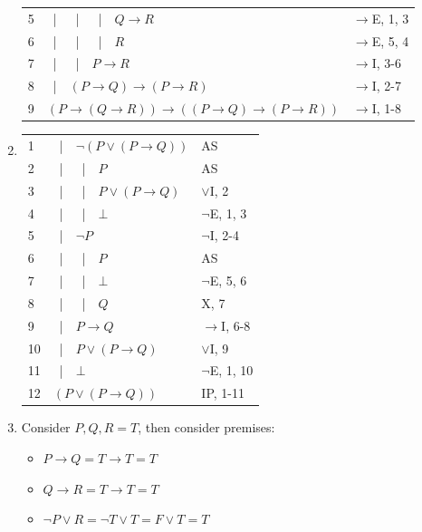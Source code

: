 \documentclass{article}
\newcommand{\asbar}{\ |\ \ }
\begin{document}
\begin{enumerate}
\begin{tabular}{l|p{8cm}l}
              5 & \asbar \asbar \asbar $Q \to R$                    & $\to$E, 1, 3 \\
              6 & \asbar \asbar \asbar $R$                          & $\to$E, 5, 4 \\
              7 & \asbar \asbar $P \to R$                           & $\to$I, 3-6  \\
              8 & \asbar $(P \to Q) \to (P \to R)$                  & $\to$I, 2-7  \\
              9 & $(P \to (Q \to R)) \to ((P \to Q) \to (P \to R))$ & $\to$I, 1-8  \\
              \hline
          \end{tabular}
    \item \begin{tabular}{l|p{8cm}l}
              \hline
              1  & \asbar $\neg (P \lor (P \to Q))$ & AS             \\
              2  & \asbar \asbar $P$                & AS             \\
              3  & \asbar \asbar $P \lor (P \to Q)$ & $\lor$I, 2     \\
              4  & \asbar \asbar $\bot$             & $\neg$E, 1, 3  \\
              5  & \asbar $ \neg P$                 & $\neg$I, 2-4   \\
              6  & \asbar \asbar $P$                & AS             \\
              7  & \asbar \asbar $\bot$             & $\neg$E, 5, 6  \\
              8  & \asbar \asbar $Q$                & X, 7           \\
              9  & \asbar $P \to Q$                 & $\to$I, 6-8    \\
              10 & \asbar $P \lor (P \to Q)$        & $\lor$I, 9     \\
              11 & \asbar $\bot$                    & $\neg$E, 1, 10 \\
              12 & $ (P \lor (P \to Q))$            & IP, 1-11       \\
          \end{tabular}
    \item Consider $P,Q,R=T$, then consider premises:
          \begin{itemize}
              \item $P \to Q = T \to T = T$
              \item $Q \to R = T \to T = T$
              \item $\neg P \lor R = \neg T \lor T = F \lor T = T$

\end{itemize}
\end{enumerate}
\end{document}
